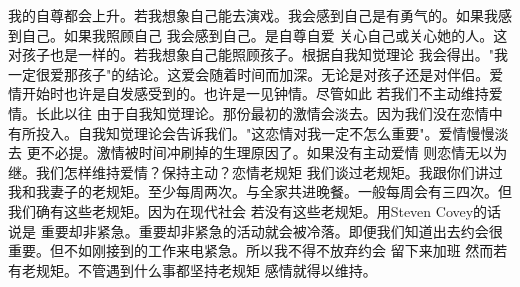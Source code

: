 我的自尊都会上升。若我想象自己能去演戏。我会感到自己是有勇气的。如果我感到自己。如果我照顾自己 我会感到自己。是自尊自爱 关心自己或关心她的人。这对孩子也是一样的。若我想象自己能照顾孩子。根据自我知觉理论 我会得出。"我一定很爱那孩子"的结论。这爱会随着时间而加深。无论是对孩子还是对伴侣。爱情开始时也许是自发感受到的。也许是一见钟情。尽管如此 若我们不主动维持爱情。长此以往 由于自我知觉理论。那份最初的激情会淡去。因为我们没在恋情中有所投入。自我知觉理论会告诉我们。"这恋情对我一定不怎么重要"。爱情慢慢淡去 更不必提。激情被时间冲刷掉的生理原因了。如果没有主动爱情 则恋情无以为继。我们怎样维持爱情？保持主动？恋情老规矩 我们谈过老规矩。我跟你们讲过我和我妻子的老规矩。至少每周两次。与全家共进晚餐。一般每周会有三四次。但我们确有这些老规矩。因为在现代社会 若没有这些老规矩。用Steven Covey的话说是 重要却非紧急。重要却非紧急的活动就会被冷落。即便我们知道出去约会很重要。但不如刚接到的工作来电紧急。所以我不得不放弃约会 留下来加班 然而若有老规矩。不管遇到什么事都坚持老规矩 感情就得以维持。 
%
%
%

